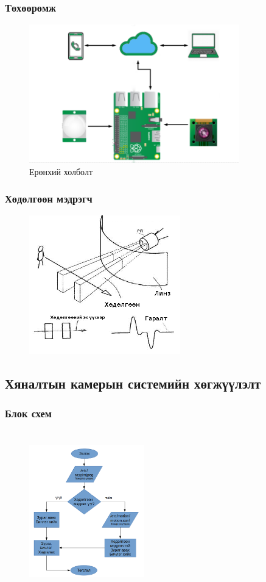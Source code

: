  
\begin{frame}
\frametitle{Төхөөрөмж}
	\begin{figure}[htp]
	\centering
	\includegraphics[width=\textwidth,height=6cm ]{figures/device.png}
	\caption{Ерөнхий холболт}
	\label{fig:lion}
	\end{figure}
 \end{frame}

\begin{frame}
\frametitle{Хөдөлгөөн мэдрэгч}
	\begin{figure}[htp]
	\centering
	\includegraphics[width=\textwidth,height=6cm ]{figures/motionexm.png}
	\label{fig:lion}
	\end{figure}
 \end{frame}
\subsection{Хяналтын камерын системийн хөгжүүлэлт} 
\begin{frame}
\frametitle{ Блок схем}
	\begin{figure}[htp]
	\centering
	\includegraphics[width=5cm,height=7cm ]{figures/block.jpg}
	\label{fig:lion}
	\end{figure}
 \end{frame}

